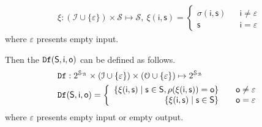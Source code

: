 \begin{equation}
\begin{split}
\xi :  (\mathcal{I}\cup\{\varepsilon\}) \times\mathcal{S} \mapsto\mathcal{S},\ \xi (\mathsf{i}, \mathsf{s})= \left\{
\begin{array}{rcl}
\sigma( \mathsf{i}, \mathsf{s})      &      & {\mathsf{i}\neq \varepsilon}\\
\mathsf{s}       &      & {\mathsf{i}= \varepsilon}
\end{array} \right. 
\end{split}
\end{equation}
where $\varepsilon$ presents empty input.

Then the ${\tt Df}( \mathsf{S},  \mathsf{i},  \mathsf{o})$ can be defined as follows.
\begin{equation}
\begin{split}
{\tt Df}&:2^{\mathcal{S}_{\mathcal{B}}}\times(\mathcal{I}\cup\{\varepsilon\})\times(\mathcal{O}\cup\{\varepsilon\})\mapsto2^{\mathcal{S}_{\mathcal{B}}}\\
{\tt Df}&( \mathsf{S},  \mathsf{i},  \mathsf{o})= \left\{
\begin{array}{rcl}
\{  \xi(\mathsf{i}, \mathsf{s} ) \mid  \mathsf{s} \in \mathsf{S},  \rho(\xi(\mathsf{i}, \mathsf{s} ))=\mathsf{o}\}     &      & {\mathsf{o}\neq \varepsilon}\\
\{  \xi(\mathsf{i}, \mathsf{s} ) \mid  \mathsf{s} \in \mathsf{S}\}       &      & {\mathsf{o}= \varepsilon}
\end{array} \right. 
\end{split}
\end{equation}
where  $\varepsilon$ presents empty input or empty output.

